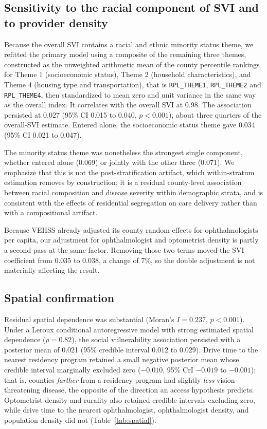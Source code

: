\documentclass[11pt]{article}
\begin{document}
\subsection{Sensitivity to the racial component of SVI and to provider density}

Because the overall SVI contains a racial and ethnic minority status theme, we
refitted the primary model using a composite of the remaining three themes,
constructed as the unweighted arithmetic mean of the county percentile rankings
for Theme 1 (socioeconomic status), Theme 2 (household characteristics), and
Theme 4 (housing type and transportation), that is \texttt{RPL\_THEME1},
\texttt{RPL\_THEME2} and \texttt{RPL\_THEME4}, then standardized to mean zero and
unit variance in the same way as the overall index. It correlates with the
overall SVI at 0.98. The
association persisted at 0.027 (95\% CI 0.015 to 0.040, $p<0.001$), about
three quarters of the overall-SVI estimate. Entered alone, the socioeconomic
status theme gave 0.034 (95\% CI 0.021 to 0.047).

The minority status theme was nonetheless the strongest single component,
whether entered alone (0.069) or jointly with the other three (0.071). We
emphasize that this is not the post-stratification artifact, which within-stratum
estimation removes by construction; it is a residual county-level association
between racial composition and disease severity within demographic strata, and
is consistent with the effects of residential segregation on care delivery
rather than with a compositional artifact.

Because VEHSS already adjusted its county random effects for ophthalmologists
per capita, our adjustment for ophthalmologist and optometrist density is
partly a second pass at the same factor. Removing those two terms moved the SVI
coefficient from 0.035 to 0.038, a change of 7\%, so the double adjustment is
not materially affecting the result.

\subsection{Spatial confirmation}

Residual spatial dependence was substantial (Moran's $I = 0.237$, $p<0.001$).
Under a Leroux conditional autoregressive model with strong estimated spatial
dependence ($\rho = 0.82$), the social vulnerability association persisted with a
posterior mean of 0.021 (95\% credible interval 0.012 to 0.029). Drive time to
the nearest residency program retained a small negative posterior mean whose
credible interval marginally excluded zero ($-0.010$, 95\% CrI $-0.019$ to
$-0.001$); that is, counties \emph{farther} from a residency program had
slightly \emph{less} vision-threatening disease, the opposite of the direction
an access hypothesis predicts. Optometrist density and rurality also retained
credible intervals excluding zero, while drive time to the nearest
ophthalmologist, ophthalmologist density, and population density did not
(Table~\ref{tab:spatial}).
\end{document}
